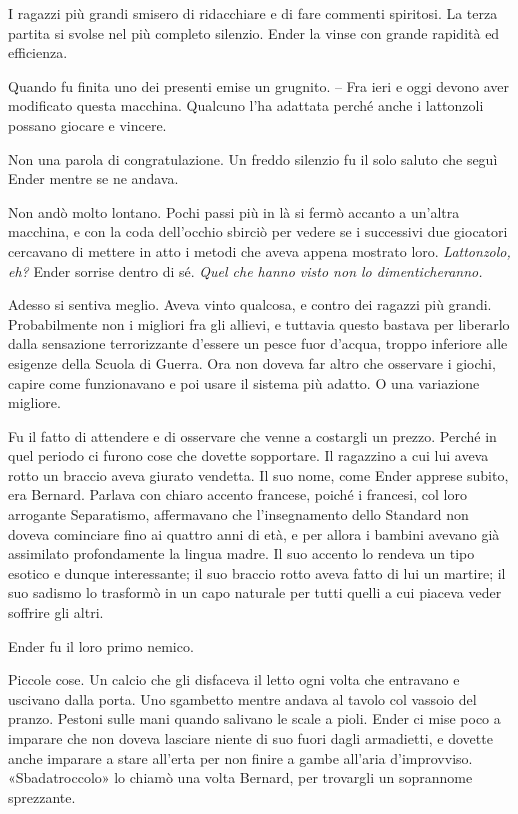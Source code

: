 {I ragazzi più grandi smisero di ridacchiare e di fare commenti
	spiritosi. La terza partita si svolse nel più completo silenzio. Ender
	la vinse con grande rapidità ed efficienza.}

{Quando fu finita uno dei presenti emise un grugnito. -- Fra ieri e oggi
	devono aver modificato questa macchina. Qualcuno l'ha adattata perché
	anche i lattonzoli possano giocare e vincere.}

{Non una parola di congratulazione. Un freddo silenzio fu il solo saluto
	che seguì Ender mentre se ne andava.}

{Non andò molto lontano. Pochi passi più in là si fermò accanto a
	un'altra macchina, e con la coda dell'occhio sbirciò per vedere se i
	successivi due giocatori cercavano di mettere in atto i metodi che aveva
	appena mostrato loro. \emph{Lattonzolo, eh?} Ender sorrise dentro di sé.
	\emph{Quel che hanno visto non lo dimenticheranno.}}

{Adesso si sentiva meglio. Aveva vinto qualcosa, e contro dei ragazzi
	più grandi. Probabilmente non i migliori fra gli allievi, e tuttavia
	questo bastava per liberarlo dalla sensazione terrorizzante d'essere un
	pesce fuor d'acqua, troppo inferiore alle esigenze della Scuola di
	Guerra. Ora non doveva far altro che osservare i giochi, capire come
	funzionavano e poi usare il sistema più adatto. O una variazione
	migliore.}

{Fu il fatto di attendere e di osservare che venne a costargli un
	prezzo. Perché in quel periodo ci furono cose che dovette sopportare. Il
	ragazzino a cui lui aveva rotto un braccio aveva giurato vendetta. Il
	suo nome, come Ender apprese subito, era Bernard. Parlava con chiaro
	accento francese, poiché i francesi, col loro arrogante Separatismo,
	affermavano che l'insegnamento dello Standard non doveva cominciare fino
	ai quattro anni di età, e per allora i bambini avevano già assimilato
	profondamente la lingua madre. Il suo accento lo rendeva un tipo esotico
	e dunque interessante; il suo braccio rotto aveva fatto di lui un
	martire; il suo sadismo lo trasformò in un capo naturale per tutti
	quelli a cui piaceva veder soffrire gli altri.}

{Ender fu il loro primo nemico.}

{Piccole cose. Un calcio che gli disfaceva il letto ogni volta che
	entravano e uscivano dalla porta. Uno sgambetto mentre andava al tavolo
	col vassoio del pranzo. Pestoni sulle mani quando salivano le scale a
	pioli. Ender ci mise poco a imparare che non doveva lasciare niente di
	suo fuori dagli armadietti, e dovette anche imparare a stare all'erta
	per non finire a gambe all'aria d'improvviso. «Sbadatroccolo» lo chiamò
	una volta Bernard, per trovargli un soprannome sprezzante.}

